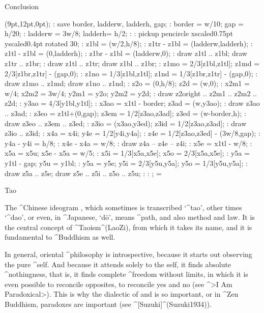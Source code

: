 
\Part Conclusion


\MTbeginchar(9pt,12pt,0pt);
 \MT: save border, ladderw, ladderh, gap;
 \MT: border = w/10; gap = h/20;
 \MT: ladderw = 3w/8; ladderh= h/2;
 \MT: %
 \MT: pickup pencircle xscaled0.75pt yscaled0.4pt rotated 30;
 \MT: z1bl = (w/2,h/8); %
 \MT: z1tr - z1bl = (ladderw,ladderh);
 \MT: z1tl - z1bl = (0,ladderh);
 \MT: z1br - z1bl = (ladderw,0);
 \MT: draw z1tl .. z1bl; draw z1tr .. z1br;
 \MT: draw z1tl .. z1tr; draw z1bl .. z1br;
 \MT: z1mo = 2/3[z1bl,z1tl]; z1md = 2/3[z1br,z1tr] - (gap,0);
 \MT: z1no = 1/3[z1bl,z1tl]; z1nd = 1/3[z1br,z1tr] - (gap,0);
 \MT: draw z1mo .. z1md; draw z1no .. z1nd;
 \MT: z2o = (0,h/8); z2d = (w,0); %
 \MT: x2m1 = w/4; x2m2 = 3w/4; y2m1 = y2o; y2m2 = y2d;
 \MT: draw z2o{right} .. z2m1 .. z2m2 .. z2d;
 \MT: y3ao = 4/3[y1bl,y1tl]; %
 \MT: x3ao = x1tl - border; z3ad = (w,y3ao);
 \MT: draw z3ao .. z3ad;
 \MT: z3eo = z1tl+(0,gap); z3em = 1/2[z3ao,z3ad]; z3ed = (w-border,h);
 \MT: draw z3eo .. z3em .. z3ed;
 \MT: z3io = (x3ao,y3ed); z3id = 1/2[z3ao,z3ad];
 \MT: draw z3io .. z3id;
 \MT: x4a = x4i; y4e = 1/2[y4i,y4a]; %
 \MT: z4e = 1/2[z3ao,z3ed] - (3w/8,gap);
 \MT: y4a - y4i = h/8; %
 \MT: x4e - x4a = w/8; %
 \MT: draw z4a -- z4e -- z4i;
 \MT: x5e = x1tl - w/8; %
 \MT: x5a = x5u; x5e - x5a = w/5; %
 \MT: x5i = 1/3[x5a,x5e]; x5o = 2/3[x5a,x5e];
 \MT: y5a = y1tl - gap; y5u = y1bl; %
 \MT: y5a = y5e; y5i = 2/3[y5u,y5a]; y5o = 1/3[y5u,y5a];
 \MT: draw z5a .. z5e; draw z5e .. z5i .. z5o .. z5u;
 \MT: %
 \MT: %
\MTendchar;
\newbox\taobox \setbox\taobox=\hbox{\raise-1.5pt\box\MTbox}
\def\tao{\copy\taobox}

\Section Tao

The ^{Chinese} ideogram \tao, which sometimes is transcribed `^{tao}',
other times `^{dao}', or even, in ^{Japanese}, `d\=o', means ^{path},
and also method and law. It is the central concept of ^{Taoism}^(LaoZi),
from which it takes its name, and it is fundamental to ^{Buddhism} as
well.

In general, oriental ^{philosophy} is introspective, because it starts
out observing the pure ^{self}. And because it attends solely to the
self, it finds absolute ^{nothingness}, that is, it finds complete
^{freedom} without limits, in which it is even possible to reconcile
opposites, to reconcile yes and no (see ^>I Am Paradoxical>). This is
why the dialectic of  and  is so important, or in
^{Zen} Buddhism, paradoxes are important (see ^[Suzuki]^(Suzuki1934)).

